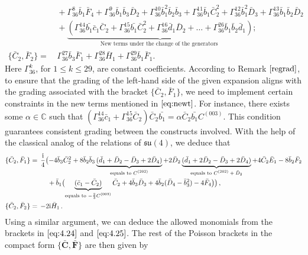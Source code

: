 \documentclass[10pt]{amsart}
\theoremstyle{definition}
\theoremstyle{corollary}
\theoremstyle{remark}
\theoremstyle{conclusion}
\begin{document}
\begin{align}
    & \, +\Gamma_{36}^8 \bar{b}_1\bar{F}_4+\Gamma_{36}^9  \bar{b}_1\bar{b}_3 \bar{D}_2 + \Gamma_{36}^{10}\bar{b}_1^2 \bar{b}_2\bar{b}_3+\Gamma_{36}^{11} \bar{b}_1\bar{C}_2^2+ \Gamma_{36}^{12} \bar{b}_1^2\bar{D}_3 +\Gamma_{36}^{13}\bar{b}_1\bar{b}_2\bar{D}_2 \nonumber \\
    & \,+\underbrace{\left(\Gamma_{36}^{14}\bar{b_1}\bar{c}_1\bar{C}_2 +\Gamma_{36}^{15} \bar{b_1} \bar{C}_2^2 + \Gamma_{36}^{16} \bar{d}_1\bar{D}_2 + \ldots + \Gamma_{36}^{26} \bar{b}_1 \bar{b}_2 \bar{d}_1 \right)}_{\text{New terms under the change of the generators }}; \label{eq:newt}\\
    \{\bar{C}_2,\bar{F}_2\} = & \, \Gamma_{36}^{  27} \bar{b}_3\bar{F}_1 +  \Gamma_{36}^{ 28}  \bar{H}_1   +  \Gamma_{36}^{ 29} \bar{b}_1  \bar{F}_1. \nonumber
\end{align} Here $\Gamma_{36}^k  $, for $1 \leq k \leq 29$,  are constant  coefficients. According to Remark $\ref{regrad}$, to ensure that the grading of the left-hand side of the given expansion aligns with the grading associated with the bracket $\{\bar{C}_2, \bar{F}_1\}$, we need to implement certain constraints in the new terms mentioned in $\eqref{eq:newt}$. For instance, there exists some $\alpha \in \mathbb{C}$ such that $\left(\Gamma_{36}^{14} \bar{c}_1 + \Gamma_{36}^{15} \bar{C}_2\right)\bar{C}_2 \bar{b_1} = \alpha \bar{C}_2 \bar{b_1} C^{(003)}$. This condition guarantees consistent grading between the constructs involved. With the help of the  classical analog of the relations of $\mathfrak{su}(4)$, we deduce that 
\begin{align}
\{\bar{C}_2, \bar{F}_{1}\}& = \,\frac{{\rm i}}{4}\bigl(-4 \bar{b}_3 \bar{C}_2^2+8 \bar{b}_2 \bar{b}_3\underbrace{(\bar{d}_1+\bar{D}_2-\bar{D}_3+2 \bar{D}_4)}_{\text{equals to $C^{(202)}$}}+ 2 \bar{D}_2\underbrace{(\bar{d}_1 +2 \bar{D}_2- \bar{D}_3+2 \bar{D}_4)}_{\text{equals to $C^{(202)} +\bar{D}_2$}} +4 \bar{C}_2 \bar{E}_1-8 \bar{b}_2 \bar{F}_2 \nonumber\\
& \hskip 0.9cm +\bar{b}_1\bigl(\underbrace{(\bar{c}_1-\bar{C}_2)}_{\text{equals to $-\frac{2}{3}C^{(003)}$} }\bar{C}_2+4 \bar{b}_3 \bar{D}_3+4 \bar{b}_2(\bar{D}_4-\bar{b}_3^2)-4 \bar{F}_4\bigl) \bigl) \, ,\nonumber \\
\{\bar{C}_2, \bar{F}_{2}\}&= \, -2{\rm i}\bar{H}_1 \, .
\end{align} 
Using a similar argument, we can deduce the allowed monomials from the brackets in $\eqref{eq:4.24}$ and $\eqref{eq:4.25}$.  The rest of the Poisson brackets in the compact form $\{\bar{\textbf{C}},\bar{\textbf{F}}\}$ are then given by
\end{document}
